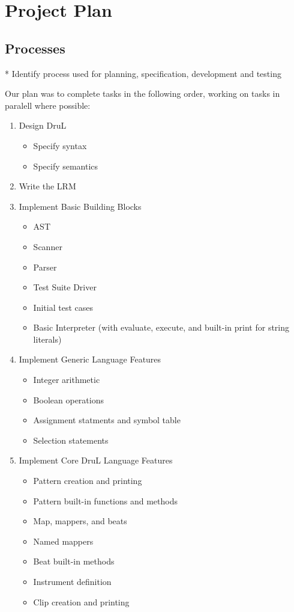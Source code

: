 \chapter{Project Plan}

\section{Processes}
* Identify process used for planning, specification, development and testing

Our plan was to complete tasks in the following order, working on tasks in paralell where possible:

\begin{enumerate}

\item Design DruL
\begin{itemize}
	\item Specify syntax
	\item Specify semantics
\end{itemize}

\item Write the LRM

\item Implement Basic Building Blocks
\begin{itemize}
	\item AST
	\item Scanner
	\item Parser
	\item Test Suite Driver
	\item Initial test cases
	\item Basic Interpreter (with evaluate, execute, and built-in print for string literals)
\end{itemize}

\item Implement Generic Language Features
\begin{itemize}
	\item Integer arithmetic
	\item Boolean operations
	\item Assignment statments and symbol table
	\item Selection statements
\end{itemize}

\item Implement Core DruL Language Features
\begin{itemize}
	\item Pattern creation and printing
	\item Pattern built-in functions and methods
	\item Map, mappers, and beats
	\item Named mappers
	\item Beat built-in methods
	\item Instrument definition
	\item Clip creation and printing
\end{itemize}


\end{enumerate}

